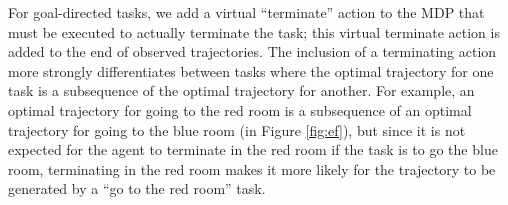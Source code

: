 \documentclass[conference]{IEEEtran}
\begin{document}

For goal-directed tasks, we add a virtual ``terminate'' action to the MDP that must be executed to actually terminate the task; this virtual terminate action is added to the end of observed trajectories. The inclusion of a terminating action more strongly differentiates between tasks where the optimal trajectory for one task is a subsequence of the optimal trajectory for another. For example, an optimal trajectory for going to the red room is a subsequence of an optimal trajectory for going to the blue room (in Figure \ref{fig:ef}), but since it is not expected for the agent to terminate in the red room if the task is to go the blue room, terminating in the red room makes it more likely for the trajectory to be generated by a ``go to the red room'' task.

\end{document}
